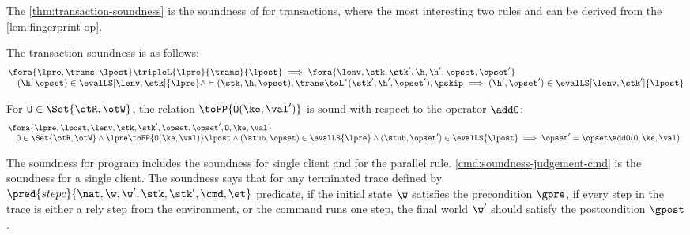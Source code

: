 The \cref{thm:transaction-soundness} is the soundness of for transactions, where the most interesting two rules  and  can be derived from the \cref{lem:fingerprint-op}.

\begin{theorem}
\label{thm:transaction-soundness}
The transaction soundness is as follows:
\[
    \begin{array}{@{}l@{}}
        \fora{ \lpre, \trans, \lpost } \tripleL{\lpre}{\trans}{\lpost}
        \implies 
        \fora{\lenv, \stk, \stk', \h, \h', \opset, \opset' }  \\
        \quad (\h, \opset) \in \evalLS[\lenv, \stk]{\lpre}
        \land \vdash (\stk, \h, \opset ), \trans \toL^{*}  (\stk', \h', \opset' ), \pskip 
        \implies (\h', \opset') \in \evalLS[\lenv, \stk']{\lpost}
    \end{array}
\]
\end{theorem}

\begin{lemma}
\label{lem:fingerprint-op}
For \( \mathtt{O} \in \Set{\otR, \otW} \), the relation \( \toFP{\mathtt{O}(\ke,\val')}\) is sound with respect to the operator \( \addO \):
\[
\begin{array}{@{}l}
    \fora{\lpre, \lpost, \lenv, \stk, \stk', \opset, \opset', \mathtt{O}, \ke, \val} \\
    \quad \mathtt{O} \in \Set{\otR, \otW} 
    \land \lpre \toFP{\mathtt{O}(\ke,\val)} \lpost
    \land (\stub, \opset) \in \evalLS{\lpre}
    \land (\stub, \opset') \in \evalLS{\lpost}
    \implies \opset' = \opset \addO (\mathtt{O}, \ke, \val)
\end{array}
\]
\end{lemma}

The soundness for program includes the soundness for single client and for the parallel rule.
\cref{cmd:soundness-judgement-cmd} is the soundness for a single client.
The soundness says that for any terminated trace defined by \( \pred{stepc}{\nat, \w, \w', \stk, \stk', \cmd, \et} \) predicate,
if the initial state \( \w \) satisfies the precondition \( \gpre \), if every step in the trace is either a rely step from the environment, 
or the command runs one step, the final world \( \w' \) should satisfy the postcondition \( \gpost \).

